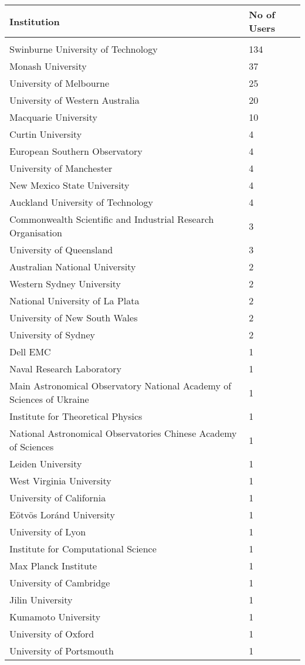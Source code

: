 \documentclass{article}%
\begin{document}
%
\begin{longtabu}{X[l] X[r]}%
\textbf{Institution}&\textbf{No of Users}\\%
\hline%
&\\%
Swinburne University of Technology&134\\%
\hline%
Monash University&37\\%
\hline%
University of Melbourne&25\\%
\hline%
University of Western Australia&20\\%
\hline%
Macquarie University&10\\%
\hline%
Curtin University&4\\%
\hline%
European Southern Observatory&4\\%
\hline%
University of Manchester&4\\%
\hline%
New Mexico State University&4\\%
\hline%
Auckland University of Technology&4\\%
\hline%
Commonwealth Scientific and Industrial Research Organisation&3\\%
\hline%
University of Queensland&3\\%
\hline%
Australian National University&2\\%
\hline%
Western Sydney University&2\\%
\hline%
National University of La Plata&2\\%
\hline%
University of New South Wales&2\\%
\hline%
University of Sydney&2\\%
\hline%
Dell EMC&1\\%
\hline%
Naval Research Laboratory&1\\%
\hline%
Main Astronomical Observatory National Academy of Sciences of Ukraine&1\\%
\hline%
Institute for Theoretical Physics&1\\%
\hline%
National Astronomical Observatories Chinese Academy of Sciences&1\\%
\hline%
Leiden University&1\\%
\hline%
West Virginia University&1\\%
\hline%
University of California&1\\%
\hline%
Eötvös Loránd University&1\\%
\hline%
University of Lyon&1\\%
\hline%
Institute for Computational Science&1\\%
\hline%
Max Planck Institute&1\\%
\hline%
University of Cambridge&1\\%
\hline%
Jilin University&1\\%
\hline%
Kumamoto University&1\\%
\hline%
University of Oxford&1\\%
\hline%
University of Portsmouth&1\\%
\hline%
\end{longtabu}%
\end{document}
